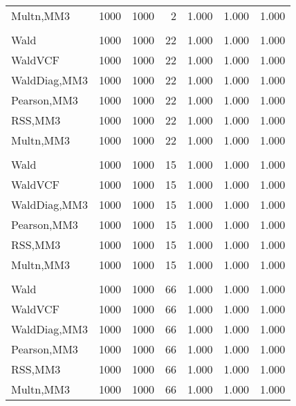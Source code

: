 \documentclass[
]{article}
\begin{document}
\begin{table}[H]
{\begin{tabular}[t]{lrrrrrr}
\hspace{1em}Multn,MM3 & 1000 & 1000 & 2 & 1.000 & 1.000 & 1.000\\
\addlinespace[0.3em]
\multicolumn{7}{l}{\textbf{1F 15V}}\\
\hspace{1em}Wald & 1000 & 1000 & 22 & 1.000 & 1.000 & 1.000\\
\hspace{1em}WaldVCF & 1000 & 1000 & 22 & 1.000 & 1.000 & 1.000\\
\hspace{1em}WaldDiag,MM3 & 1000 & 1000 & 22 & 1.000 & 1.000 & 1.000\\
\hspace{1em}Pearson,MM3 & 1000 & 1000 & 22 & 1.000 & 1.000 & 1.000\\
\hspace{1em}RSS,MM3 & 1000 & 1000 & 22 & 1.000 & 1.000 & 1.000\\
\hspace{1em}Multn,MM3 & 1000 & 1000 & 22 & 1.000 & 1.000 & 1.000\\
\addlinespace[0.3em]
\multicolumn{7}{l}{\textbf{2F 10V}}\\
\hspace{1em}Wald & 1000 & 1000 & 15 & 1.000 & 1.000 & 1.000\\
\hspace{1em}WaldVCF & 1000 & 1000 & 15 & 1.000 & 1.000 & 1.000\\
\hspace{1em}WaldDiag,MM3 & 1000 & 1000 & 15 & 1.000 & 1.000 & 1.000\\
\hspace{1em}Pearson,MM3 & 1000 & 1000 & 15 & 1.000 & 1.000 & 1.000\\
\hspace{1em}RSS,MM3 & 1000 & 1000 & 15 & 1.000 & 1.000 & 1.000\\
\hspace{1em}Multn,MM3 & 1000 & 1000 & 15 & 1.000 & 1.000 & 1.000\\
\addlinespace[0.3em]
\multicolumn{7}{l}{\textbf{3F 15V}}\\
\hspace{1em}Wald & 1000 & 1000 & 66 & 1.000 & 1.000 & 1.000\\
\hspace{1em}WaldVCF & 1000 & 1000 & 66 & 1.000 & 1.000 & 1.000\\
\hspace{1em}WaldDiag,MM3 & 1000 & 1000 & 66 & 1.000 & 1.000 & 1.000\\
\hspace{1em}Pearson,MM3 & 1000 & 1000 & 66 & 1.000 & 1.000 & 1.000\\
\hspace{1em}RSS,MM3 & 1000 & 1000 & 66 & 1.000 & 1.000 & 1.000\\
\hspace{1em}Multn,MM3 & 1000 & 1000 & 66 & 1.000 & 1.000 & 1.000\\
\bottomrule
\end{tabular}}
\endgroup{}
\end{table}
\end{document}
